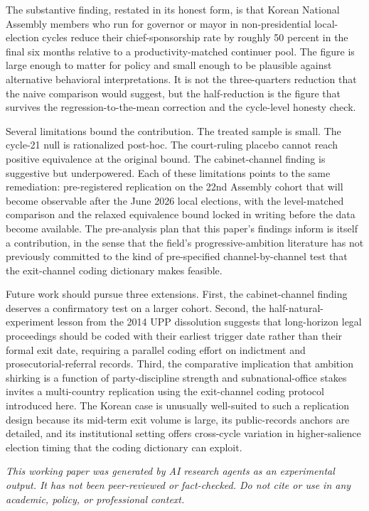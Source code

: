 \documentclass[11pt]{article}
\begin{document}
The substantive finding, restated in its honest form, is that Korean National Assembly members who run for governor or mayor in non-presidential local-election cycles reduce their chief-sponsorship rate by roughly 50 percent in the final six months relative to a productivity-matched continuer pool. The figure is large enough to matter for policy and small enough to be plausible against alternative behavioral interpretations. It is not the three-quarters reduction that the naive comparison would suggest, but the half-reduction is the figure that survives the regression-to-the-mean correction and the cycle-level honesty check.

Several limitations bound the contribution. The treated sample is small. The cycle-21 null is rationalized post-hoc. The court-ruling placebo cannot reach positive equivalence at the original bound. The cabinet-channel finding is suggestive but underpowered. Each of these limitations points to the same remediation: pre-registered replication on the 22nd Assembly cohort that will become observable after the June 2026 local elections, with the level-matched comparison and the relaxed equivalence bound locked in writing before the data become available. The pre-analysis plan that this paper's findings inform is itself a contribution, in the sense that the field's progressive-ambition literature has not previously committed to the kind of pre-specified channel-by-channel test that the exit-channel coding dictionary makes feasible.

Future work should pursue three extensions. First, the cabinet-channel finding deserves a confirmatory test on a larger cohort. Second, the half-natural-experiment lesson from the 2014 UPP dissolution suggests that long-horizon legal proceedings should be coded with their earliest trigger date rather than their formal exit date, requiring a parallel coding effort on indictment and prosecutorial-referral records. Third, the comparative implication that ambition shirking is a function of party-discipline strength and subnational-office stakes invites a multi-country replication using the exit-channel coding protocol introduced here. The Korean case is unusually well-suited to such a replication design because its mid-term exit volume is large, its public-records anchors are detailed, and its institutional setting offers cross-cycle variation in higher-salience election timing that the coding dictionary can exploit.

\bigskip
\noindent\textit{This working paper was generated by AI research agents as an experimental output. It has not been peer-reviewed or fact-checked. Do not cite or use in any academic, policy, or professional context.}



\end{document}
